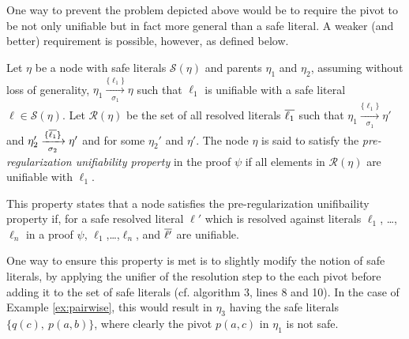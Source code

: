 \noindent
One way to prevent the problem depicted above would be to require the pivot to be not only unifiable but in fact more general than a safe literal. A weaker (and better) requirement is possible, however, as defined below.


\begin{definition}
\label{prop:pair}
Let $\eta$ be a node with safe literals $\mathcal{S}(\eta)$ and parents $\eta_1$ and $\eta_2$, assuming without loss of generality, $\eta_1 \xrightarrow[\sigma_1]{\{\ell_1\} } \eta$ such that $\ell_1$ is unifiable with a safe literal $\ell \in \mathcal{S}(\eta)$. 
Let $\mathcal{R}(\eta)$ be the set of all resolved literals $\overline{\ell_1}$ such that $\eta_1 \xrightarrow[\sigma_1]{\{\ell_1\} } \eta'$ and $\eta_2' \xrightarrow[\sigma_2]{\{\overline{\ell_1}\} } \eta'$ and  for some $\eta_2'$ and $\eta'$.
The node $\eta$ is said to satisfy the \emph{pre-regularization unifiability property} in the proof $\psi$ if all elements in $\mathcal{R}(\eta)$ are unifiable with $\ell_1$.
\end{definition}

\noindent
This property states that a node satisfies the pre-regularization unifibaility property if, for a safe resolved literal $\ell'$ which is resolved against literals $\ell_1$, \ldots, $\ell_n$ in a proof $\psi$, $\ell_1$,\ldots,$\ell_n$, and $\overline{\ell'}$ are unifiable.

One way to ensure this property is met is to slightly modify the notion of safe literals, by applying the unifier of the resolution step to the each pivot before adding it to the set of safe literals (cf. algorithm 3, lines 8 and 10). In the case of Example \ref{ex:pairwise}, this would result in $\eta_3$ having the safe literals $\{q(c),~p(a,b)\}$, where clearly the pivot $p(a,c)$ in $\eta_1$ is not safe.


